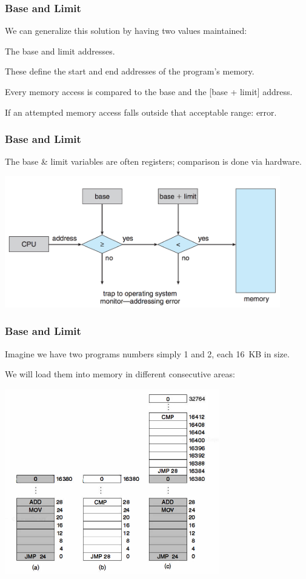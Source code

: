 \begin{frame}
\frametitle{Base and Limit}

We can generalize this solution by having two values maintained: 

The \alert{base} and \alert{limit} addresses. 

These define the start and end addresses of the program's memory.

Every memory access is compared to the base and the [base + limit] address. 

If an attempted memory access falls outside that acceptable range: error. 

\end{frame}

\begin{frame}
\frametitle{Base and Limit}

The base \& limit variables are often registers; comparison is done via hardware.

\begin{center}
\includegraphics[width=0.9\textwidth]{images/memory-baselimit.png}
\end{center}


\end{frame}

\begin{frame}
\frametitle{Base and Limit}

Imagine we have two programs numbers simply 1 and 2, each 16~KB in size.

We will load them into memory in different consecutive areas:

\begin{center}
\includegraphics[width=0.70\textwidth]{images/os360.png}
\end{center}


\end{frame}


